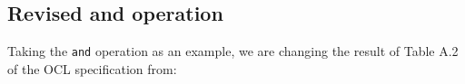 \documentclass[
]{ceurart}
\begin{document}
\subsection{Revised and operation}


 






Taking the \verb|and| operation as an example, we are changing the result of Table A.2 of the OCL specification from:
\end{document}
